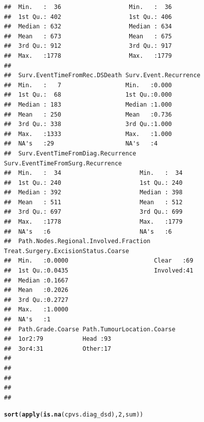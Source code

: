 \documentclass{article}\usepackage[]{graphicx}\usepackage[]{color}
\makeatletter
\newcommand{\hlnum}[1]{\textcolor[rgb]{0.686,0.059,0.569}{#1}}%
\newcommand{\hlstd}[1]{\textcolor[rgb]{0.345,0.345,0.345}{#1}}%
\newcommand{\hlkwd}[1]{\textcolor[rgb]{0.737,0.353,0.396}{\textbf{#1}}}%
\newenvironment{kframe}{%
 \def\at@end@of@kframe{}%
 \ifinner\ifhmode%
  \def\at@end@of@kframe{\end{minipage}}%
  \begin{minipage}{\columnwidth}%
 \fi\fi%
 \def\FrameCommand##1{\hskip\@totalleftmargin \hskip-\fboxsep
 \colorbox{shadecolor}{##1}\hskip-\fboxsep
     \hskip-\linewidth \hskip-\@totalleftmargin \hskip\columnwidth}%
 \MakeFramed {\advance\hsize-\width
   \@totalleftmargin\z@ \linewidth\hsize
   \@setminipage}}%
 {\par\unskip\endMakeFramed%
 \at@end@of@kframe}
\newenvironment{knitrout}{}{} %
\makeatother
\begin{document}
\begin{knitrout}
\begin{kframe}
\begin{verbatim}
##  Min.   :  36                   Min.   :  36                  
##  1st Qu.: 402                   1st Qu.: 406                  
##  Median : 632                   Median : 634                  
##  Mean   : 673                   Mean   : 675                  
##  3rd Qu.: 912                   3rd Qu.: 917                  
##  Max.   :1778                   Max.   :1779                  
##                                                               
##  Surv.EventTimeFromRec.DSDeath Surv.Event.Recurrence
##  Min.   :   7                  Min.   :0.000        
##  1st Qu.:  68                  1st Qu.:0.000        
##  Median : 183                  Median :1.000        
##  Mean   : 250                  Mean   :0.736        
##  3rd Qu.: 338                  3rd Qu.:1.000        
##  Max.   :1333                  Max.   :1.000        
##  NA's   :29                    NA's   :4            
##  Surv.EventTimeFromDiag.Recurrence Surv.EventTimeFromSurg.Recurrence
##  Min.   :  34                      Min.   :  34                     
##  1st Qu.: 240                      1st Qu.: 240                     
##  Median : 392                      Median : 398                     
##  Mean   : 511                      Mean   : 512                     
##  3rd Qu.: 697                      3rd Qu.: 699                     
##  Max.   :1778                      Max.   :1779                     
##  NA's   :6                         NA's   :6                        
##  Path.Nodes.Regional.Involved.Fraction Treat.Surgery.ExcisionStatus.Coarse
##  Min.   :0.0000                        Clear   :69                        
##  1st Qu.:0.0435                        Involved:41                        
##  Median :0.1667                                                           
##  Mean   :0.2026                                                           
##  3rd Qu.:0.2727                                                           
##  Max.   :1.0000                                                           
##  NA's   :1                                                                
##  Path.Grade.Coarse Path.TumourLocation.Coarse
##  1or2:79           Head :93                  
##  3or4:31           Other:17                  
##                                              
##                                              
##                                              
##                                              
## 
\end{verbatim}
\begin{alltt}
\hlkwd{sort}\hlstd{(}\hlkwd{apply}\hlstd{(}\hlkwd{is.na}\hlstd{(cpvs.diag_dsd),} \hlnum{2}\hlstd{, sum))}

\end{alltt}
\end{kframe}
\end{knitrout}
\end{document}
